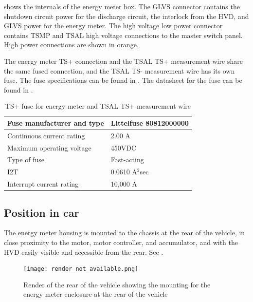 \documentclass{article}
\begin{document}
 shows the internals of the energy meter box. The GLVS connector contains the shutdown circuit power for the discharge circuit, the interlock from the HVD, and GLVS power for the energy meter. The high voltage low power connector contains TSMP and TSAL high voltage connections to the master switch panel. High power connections are shown in orange.

The energy meter TS+ connection and the TSAL TS+ measurement wire share the same fused connection, and the TSAL TS- measurement wire has its own fuse. The fuse specifications can be found in . The datasheet for the fuse can be found in .

\begin{table}[H]
	\centering
	\begin{tabular}{|l|l|}
	\hline
	Fuse manufacturer and type & Littelfuse 80812000000 \\ \hline
	Continuous current rating & 2.00 A \\ \hline
	Maximum operating voltage & 450VDC \\ \hline
	Type of fuse & Fast-acting \\ \hline
	I2T & 0.0610 A$^{2}$sec \\ \hline
	Interrupt current rating & 10,000 A \\ \hline
	\end{tabular}
	\caption{TS+ fuse for energy meter and TSAL TS+ measurement wire}
	\label{tab:TSAL_and_EM_fuse}
\end{table}

\subsection{Position in car}
The energy meter housing is mounted to the chassis at the rear of the vehicle, in close proximity to the motor, motor controller, and accumulator, and with the HVD easily visible and accessible from the rear. See .

\begin{figure}
\centering
\texttt{[image: render\_not\_available.png]}
\caption{Render of the rear of the vehicle showing the mounting for the energy meter enclosure at the rear of the vehicle}
\label{fig:energy_meter_mounting_render}
\end{figure}
\end{document}
